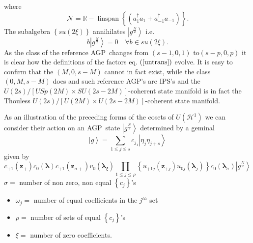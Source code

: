 \documentclass[aps,preprint]{revtex4}%
\begin{document}
where
\begin{equation}
\mathcal{N}=\mathbb{R-}\operatorname{linspan}\left\{  \left(  a_{1}^{\dagger
}a_{1}+a_{-1}^{\dagger}a_{-1}\right)  \right\}  .
\end{equation}
The subalgebra $\left\{  su\left(  2\xi\right)  \right\}  $ annihilates
$\left\vert g^{\frac{N}{2}}\right\rangle $ i.e.
\begin{equation}
b\left\vert g^{\frac{N}{2}}\right\rangle =0\quad\forall b\in su\left(
2\xi\right)  .
\end{equation}
As the class of the reference AGP\ changes from $\left(  s-1,0,1\right)  $
to$\left(  s-p,0,p\right)  $ it is clear how the definitions of the factors
eq. $\left(  \ref{untrans}\right)  $ evolve. It is easy to confirm that the
$\left(  M,0,s-M\right)  $ cannot in fact exist, while the class $\left(
0,M,s-M\right)  $ does and such reference AGP's are IPS's and the $U\left(
2s\right)  /\left[  USp\left(  2M\right)  \times SU\left(  2s-2M\right)
\right]  $-coherent state manifold is in fact the Thouless $U\left(
2s\right)  /\left[  U\left(  2M\right)  \times U\left(  2s-2M\right)  \right]
$-coherent state manifold.

As an illustration of the preceding forms of the cosets of $U\left(
\mathcal{H}^{1}\right)  $ we can consider their action on an AGP\ state
$\left\vert g^{\frac{N}{2}}\right\rangle $ determined by a geminal
\begin{equation}
\left\vert g\right\rangle =\sum_{1\leq j\leq s}c_{j_{1}}\left\vert \eta
_{j}\eta_{j+s}\right\rangle
\end{equation}
given by
\begin{equation}
c_{+1}\left(  \mathbf{z}_{+}\right)  c_{0}\left(  \mathbf{\lambda}\right)
c_{+1}\left(  \mathbf{z}_{\sigma+}\right)  v_{0}\left(  \mathbf{\lambda}_{\xi
}\right)
{\textstyle\prod_{1\leq j\leq\rho}}
\left\{  u_{+1j}\left(  \mathbf{z}_{+j}\right)  u_{0j}\left(  \mathbf{\lambda
}_{j}\right)  \right\}  c_{0}\left(  \mathbf{\lambda}_{\sigma}\right)
\left\vert g^{\frac{N}{2}}\right\rangle
\end{equation}
$\sigma=$ number of non zero, non equal $\left\{  c_{j}\right\}  $'s

\begin{description}
\item
\begin{itemize}
\item $\omega_{j}=$ number of equal coefficients in the $j^{th}$ set

\item $\rho=$ number of sets of equal $\left\{  c_{j}\right\}  $'s

\item $\xi=$ number of zero coefficients.
\end{itemize}
\end{description}
\end{document}
